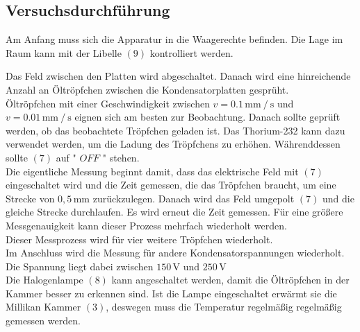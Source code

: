 \subsection{Versuchsdurchführung}
Am Anfang muss sich die Apparatur in die Waagerechte befinden. Die Lage im Raum kann mit der Libelle $(9)$ kontrolliert werden.

Das Feld zwischen den Platten wird abgeschaltet. Danach wird eine hinreichende Anzahl an Öltröpfchen zwischen die Kondensatorplatten gesprüht. \\

Öltröpfchen mit einer Geschwindigkeit zwischen $v = 0.1 \, \unit{\milli\meter} \mathbin{/} \unit{\second}$ und $v = 0.01 \, \unit{\milli\meter} \mathbin{/} \unit{\second}$ eignen sich am besten zur Beobachtung.
Danach sollte geprüft werden, ob das beobachtete Tröpfchen geladen ist. Das Thorium-232 kann dazu verwendet werden, um die Ladung des Tröpfchens zu erhöhen. Währenddessen sollte $(7)$ auf " $OFF$ "${}$ stehen. \\

Die eigentliche Messung beginnt damit, dass das elektrische Feld mit $(7)$ eingeschaltet wird und die Zeit gemessen, die das Tröpfchen braucht, um eine Strecke von $0,5 \,\si{\milli\meter}$ zurückzulegen.
Danach wird das Feld umgepolt $ (7) $ und die gleiche Strecke durchlaufen. 
Es wird erneut die Zeit gemessen. 
Für eine größere Messgenauigkeit kann dieser Prozess mehrfach wiederholt werden.
\\

Dieser Messprozess wird für vier weitere Tröpfchen wiederholt.\\

Im Anschluss wird die Messung für andere Kondensatorspannungen wiederholt. Die Spannung liegt dabei zwischen $150 \, \unit{\volt}$ und $250 \, \unit{\volt}$\\

Die Halogenlampe $(8)$ kann angeschaltet werden, damit die Öltröpfchen in der Kammer besser zu erkennen sind.
Ist die Lampe eingeschaltet erwärmt sie die Millikan Kammer $(3)$, deswegen muss die Temperatur regelmäßig regelmäßig gemessen werden.
